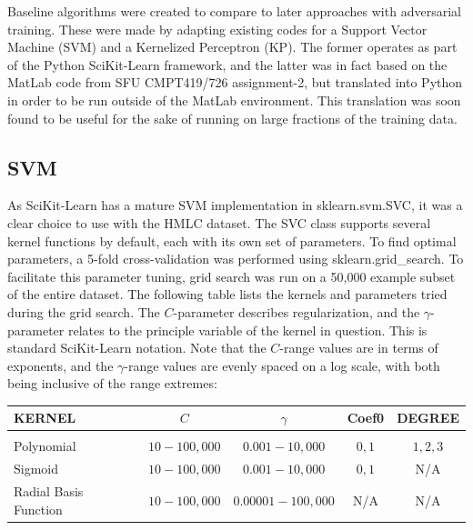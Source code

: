 \documentclass          {article} %
\begin{document}
Baseline algorithms were created to compare to later approaches with adversarial training. These were made by adapting existing codes for a Support Vector Machine (SVM) and a Kernelized Perceptron (KP). The former operates as part of the Python SciKit-Learn framework, and the latter was in fact based on the MatLab code from SFU CMPT419/726 assignment-2, but translated into Python in order to be run outside of the MatLab environment. This translation was soon found to be useful for the sake of running on large fractions of the training data.

            \subsection {SVM}
            \label      {SVM}
As SciKit-Learn has a mature SVM implementation in sklearn.svm.SVC, it was a clear choice to use with the HMLC dataset. The SVC class supports several kernel functions by default, each with its own set of parameters. To find optimal parameters, a 5-fold cross-validation was performed using sklearn.grid\_search. To facilitate this parameter tuning, grid search was run on a 50,000 example subset of the entire dataset. The following table lists the kernels and parameters tried during the grid search. The $C$-parameter describes regularization, and the $\gamma$-parameter relates to the principle variable of the kernel in question. This is standard SciKit-Learn notation. Note that the $C$-range values are in terms of exponents, and the $\gamma$-range values are evenly spaced on a log scale, with both being inclusive of the range extremes:

\begin{center}
\begin{tabular}{l c c c c}
{\bf KERNEL} & $C$ & $\gamma$ & {\bf Coef0} & {\bf DEGREE}
\\ \hline \\
Polynomial            & $10-100,000$ & $0.001-10,000$    & $0,1$ & $1,2,3$\\
Sigmoid               & $10-100,000$ & $0.001-10,000$    & $0,1$ & N/A\\
Radial Basis Function & $10-100,000$ & $0.00001-100,000$ & N/A   & N/A\\
\end{tabular}
\end{center}
\end{document}

